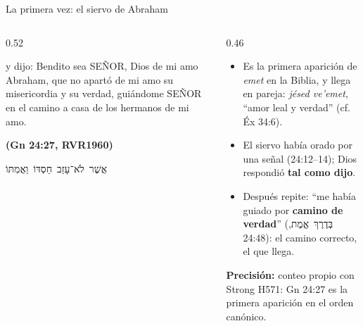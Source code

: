 \documentclass[hyperref={bookmarks=false},aspectratio=169]{beamer}
\newcommand{\heb}[1]{\mbox{\foreignlanguage{hebrew}{#1}}}
\newcommand{\SENOR}{S{\fontsize{0.78em}{1em}\selectfont EÑOR}}
\newcommand{\fuente}[1]{\par\hfill{\upshape\bfseries\footnotesize\textcolor{azul}{#1}}}
\newcommand{\destacar}[1]{\textbf{\textcolor{azul}{#1}}}
\newcommand{\precision}[1]{{\footnotesize\color{gris}\textbf{Precisión:} #1}}
\begin{document}
\begin{frame}{La primera vez: el siervo de Abraham}
\begin{columns}[t,onlytextwidth]
\begin{column}{0.52\textwidth}
\begin{cita}y dijo: Bendito sea \SENOR{}, Dios de mi amo Abraham, que no apartó de mi amo su misericordia y su verdad, guiándome \SENOR{} en el camino a casa de los hermanos de mi amo.\fuente{(Gn 24:27, RVR1960)}\end{cita}
\begin{center}\heb{אֲשֶׁר לֹא־עָזַב חַסְדּוֹ וַאֲמִתּוֹ}\end{center}
\end{column}
\begin{column}{0.46\textwidth}\small
\begin{itemize}
\item Es la primera aparición de \emph{emet} en la Biblia, y llega en pareja: \emph{jésed ve'emet}, ``amor leal y verdad'' (cf. Éx 34:6).
\item El siervo había orado por una señal (24:12--14); Dios respondió \destacar{tal como dijo}.
\item Después repite: ``me había guiado por \destacar{camino de verdad}'' (\heb{בְּדֶרֶךְ אֱמֶת}, 24:48): el camino correcto, el que llega.
\end{itemize}
\precision{conteo propio con Strong H571: Gn 24:27 es la primera aparición en el orden canónico.}
\end{column}
\end{columns}
\end{frame}
\end{document}
